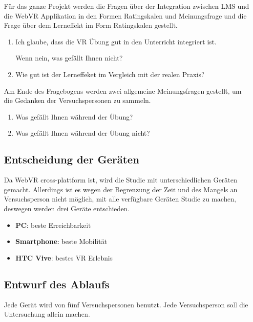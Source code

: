 Für das ganze Projekt werden die Fragen über der Integration zwischen LMS und die WebVR Applikation in den Formen Ratingskalen und Meinungsfrage und die Frage über dem Lerneffekt im Form Ratingskalen gestellt.

\begin{enumerate}
    \item Ich glaube, dass die VR Übung gut in den Unterricht integriert ist.
    
    Wenn nein, was gefällt Ihnen nicht?
    
    \item Wie gut ist der Lerneffeket im Vergleich mit der realen Praxis? 
\end{enumerate}

Am Ende des Fragebogens werden zwei allgemeine Meinungsfragen gestellt, um die Gedanken der Versuchspersonen zu sammeln.

\begin{enumerate}
    \item Was gefällt Ihnen während der Übung?
    
    \item Was gefällt Ihnen während der Übung nicht?
\end{enumerate}

\subsection{Entscheidung der Geräten}

Da WebVR cross-plattform ist, wird die Studie mit unterschiedlichen Geräten gemacht. Allerdings ist es wegen der Begrenzung der Zeit und des Mangels an Versuchsperson nicht möglich, mit alle verfügbare Geräten Studie zu machen, deswegen werden drei Geräte entschieden.

\begin{itemize}
    \item \textbf{PC}: beste Erreichbarkeit
    \item \textbf{Smartphone}: beste Mobilität
    \item \textbf{HTC Vive}: bestes VR Erlebnis
\end{itemize}

\subsection{Entwurf des Ablaufs}

Jede Gerät wird von fünf Versuchspersonen benutzt. Jede Versuchsperson soll die Untersuchung allein machen.

